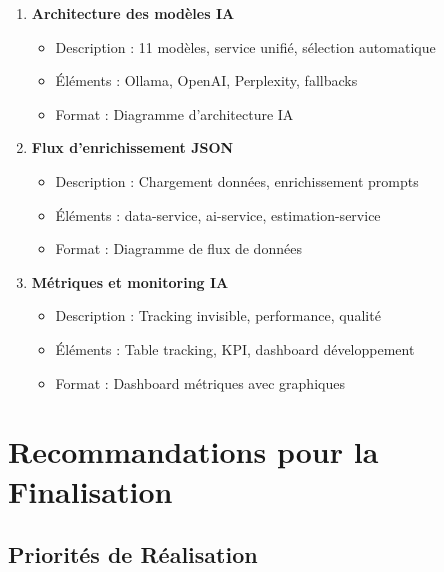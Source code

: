 \begin{enumerate}
    \item \textbf{Architecture des modèles IA}
    \begin{itemize}
        \item Description : 11 modèles, service unifié, sélection automatique
        \item Éléments : Ollama, OpenAI, Perplexity, fallbacks
        \item Format : Diagramme d'architecture IA
    \end{itemize}
    
    \item \textbf{Flux d'enrichissement JSON}
    \begin{itemize}
        \item Description : Chargement données, enrichissement prompts
        \item Éléments : data-service, ai-service, estimation-service
        \item Format : Diagramme de flux de données
    \end{itemize}
    
    \item \textbf{Métriques et monitoring IA}
    \begin{itemize}
        \item Description : Tracking invisible, performance, qualité
        \item Éléments : Table tracking, KPI, dashboard développement
        \item Format : Dashboard métriques avec graphiques
    \end{itemize}
\end{enumerate}

\section{Recommandations pour la Finalisation}

\subsection{Priorités de Réalisation}

